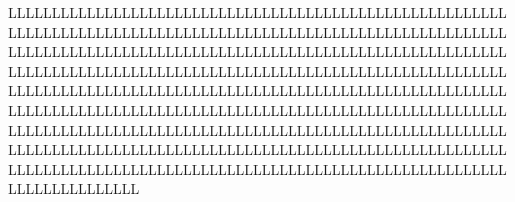 LLL LLL LLL LLL LLL LLL LLL LLL LLL LLL LLL LLL LLL LLL LLL LLL LLL LLL LLL LLL LLL LLL LLL LLL LLL LLL LLL LLL LLL LLL LLL LLL LLL LLL LLL LLL LLL LLL LLL LLL LLL LLL LLL LLL LLL LLL LLL LLL LLL LLL LLL LLL LLL LLL LLL LLL LLL LLL LLL LLL LLL LLL LLL LLL LLL LLL LLL LLL LLL LLL LLL LLL LLL LLL LLL LLL LLL LLL LLL LLL LLL LLL LLL LLL LLL LLL LLL LLL LLL LLL LLL LLL LLL LLL LLL LLL LLL LLL LLL LLL LLL LLL LLL LLL LLL LLL LLL LLL LLL LLL LLL LLL LLL LLL LLL LLL LLL LLL LLL LLL LLL LLL LLL LLL LLL LLL LLL LLL LLL LLL LLL LLL LLL LLL LLL LLL LLL LLL LLL LLL LLL LLL LLL LLL LLL LLL LLL LLL LLL LLL LLL LLL LLL LLL LLL LLL LLL LLL LLL LLL LLL LLL LLL LLL LLL LLL LLL LLL LLL LLL LLL LLL LLL LLL LLL LLL 